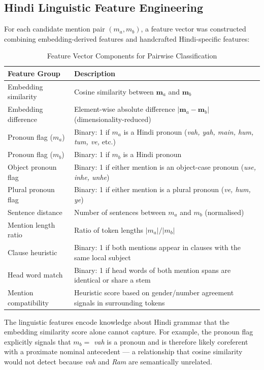 \documentclass[12pt,a4paper]{report}
\begin{document}
\subsection{Hindi Linguistic Feature Engineering}

For each candidate mention pair $(m_a, m_b)$, a feature vector was constructed combining embedding-derived features and handcrafted Hindi-specific features:

\begin{table}[H]
\centering
\caption{Feature Vector Components for Pairwise Classification}
\begin{tabular}{|l|p{8cm}|}
\hline
\textbf{Feature Group} & \textbf{Description} \\
\hline
Embedding similarity & Cosine similarity between $\mathbf{m}_a$ and $\mathbf{m}_b$ \\
Embedding difference & Element-wise absolute difference $|\mathbf{m}_a - \mathbf{m}_b|$ (dimensionality-reduced) \\
Pronoun flag ($m_a$) & Binary: 1 if $m_a$ is a Hindi pronoun (\textit{vah, yah, main, hum, tum, ve,} etc.) \\
Pronoun flag ($m_b$) & Binary: 1 if $m_b$ is a Hindi pronoun \\
Object pronoun flag & Binary: 1 if either mention is an object-case pronoun (\textit{use, inhe, unhe}) \\
Plural pronoun flag & Binary: 1 if either mention is a plural pronoun (\textit{ve, hum, ye}) \\
Sentence distance & Number of sentences between $m_a$ and $m_b$ (normalised) \\
Mention length ratio & Ratio of token lengths $|m_a| / |m_b|$ \\
Clause heuristic & Binary: 1 if both mentions appear in clauses with the same local subject \\
Head word match & Binary: 1 if head words of both mention spans are identical or share a stem \\
Mention compatibility & Heuristic score based on gender/number agreement signals in surrounding tokens \\
\hline
\end{tabular}
\end{table}

The linguistic features encode knowledge about Hindi grammar that the embedding similarity score alone cannot capture. For example, the pronoun flag explicitly signals that $m_b = $ \textit{vah} is a pronoun and is therefore likely coreferent with a proximate nominal antecedent --- a relationship that cosine similarity would not detect because \textit{vah} and \textit{Ram} are semantically unrelated.
\end{document}
